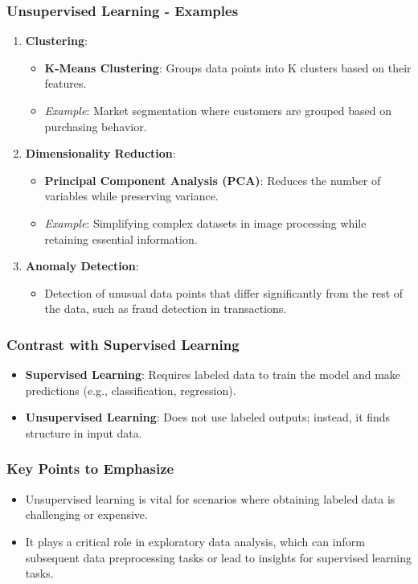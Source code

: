 \documentclass{beamer}
\begin{document}
\begin{frame}[fragile]
    \frametitle{Unsupervised Learning - Examples}
    \begin{enumerate}
        \item \textbf{Clustering}:
        \begin{itemize}
            \item \textbf{K-Means Clustering}: Groups data points into K clusters based on their features. 
            \item \textit{Example}: Market segmentation where customers are grouped based on purchasing behavior.
        \end{itemize}
        
        \item \textbf{Dimensionality Reduction}:
        \begin{itemize}
            \item \textbf{Principal Component Analysis (PCA)}: Reduces the number of variables while preserving variance.
            \item \textit{Example}: Simplifying complex datasets in image processing while retaining essential information.
        \end{itemize}
        
        \item \textbf{Anomaly Detection}:
        \begin{itemize}
            \item Detection of unusual data points that differ significantly from the rest of the data, such as fraud detection in transactions.
        \end{itemize}
    \end{enumerate}
\end{frame}

\begin{frame}[fragile]
    \frametitle{Contrast with Supervised Learning}
    \begin{itemize}
        \item \textbf{Supervised Learning}: Requires labeled data to train the model and make predictions (e.g., classification, regression).
        \item \textbf{Unsupervised Learning}: Does not use labeled outputs; instead, it finds structure in input data.
    \end{itemize}
\end{frame}

\begin{frame}[fragile]
    \frametitle{Key Points to Emphasize}
    \begin{itemize}
        \item Unsupervised learning is vital for scenarios where obtaining labeled data is challenging or expensive.
        \item It plays a critical role in exploratory data analysis, which can inform subsequent data preprocessing tasks or lead to insights for supervised learning tasks.
    \end{itemize}
\end{frame}
\end{document}
